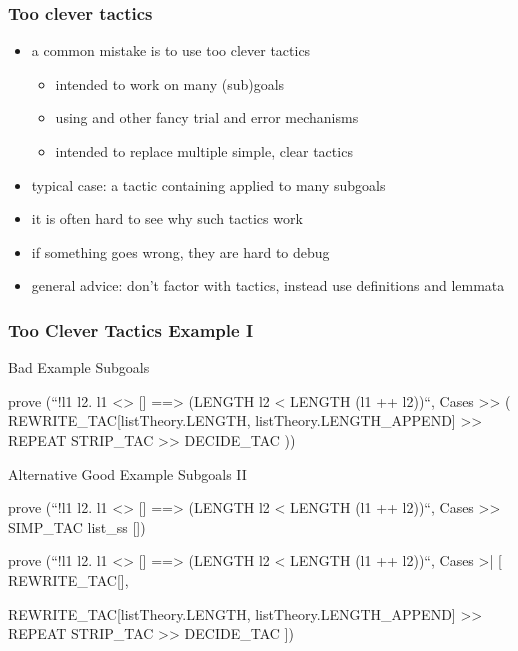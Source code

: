 \begin{frame}
\frametitle{Too clever tactics}

\begin{itemize}
\item a common mistake is to use too clever tactics 
\begin{itemize}
\item intended to work on many (sub)goals
\item using  and other fancy trial and error mechanisms
\item intended to replace multiple simple, clear tactics
\end{itemize}
\item typical case: a tactic containing  applied to many subgoals
\item it is often hard to see why such tactics work 
\item if something goes wrong, they are hard to debug
\item general advice: don't factor with tactics, instead use definitions and lemmata
\end{itemize}

\end{frame}

\begin{frame}[fragile]
\frametitle{Too Clever Tactics Example I}

\begin{alertblock}{Bad Example Subgoals}
\begin{semiverbatim}\scriptsize
prove (``!l1 l2. l1 <> [] ==> (LENGTH l2 < LENGTH (l1 ++ l2))``,
Cases >> (
  REWRITE_TAC[listTheory.LENGTH, listTheory.LENGTH_APPEND] >>
  REPEAT STRIP_TAC >> 
  DECIDE_TAC
))
\end{semiverbatim}
\end{alertblock}

\begin{exampleblock}{Alternative Good Example Subgoals II}
\begin{semiverbatim}\scriptsize
prove (``!l1 l2. l1 <> [] ==> (LENGTH l2 < LENGTH (l1 ++ l2))``,
Cases >> SIMP_TAC list_ss [])

prove (``!l1 l2. l1 <> [] ==> (LENGTH l2 < LENGTH (l1 ++ l2))``,
Cases >| [
  REWRITE_TAC[],

  REWRITE_TAC[listTheory.LENGTH, listTheory.LENGTH_APPEND] >>
  REPEAT STRIP_TAC >>
  DECIDE_TAC
])
\end{semiverbatim}
\end{exampleblock}
\end{frame}


